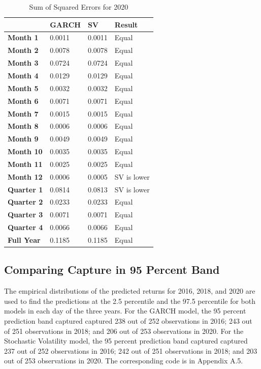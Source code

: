 \documentclass[12pt,letterpaper,reqno,fleqn]{article}
\begin{document}
\begin{table}[!ht]
    \centering
    \begin{tabular}{|l|l|l|l|}
    \hline
        ~ & \textbf{GARCH} & \textbf{SV} & \textbf{Result} \\ \hline
        \textbf{Month 1} & 0.0011 & 0.0011 & Equal \\ \hline
        \textbf{Month 2} & 0.0078 & 0.0078 & Equal \\ \hline
        \textbf{Month 3} & 0.0724 & 0.0724 & Equal \\ \hline
        \textbf{Month 4} & 0.0129 & 0.0129 & Equal \\ \hline
        \textbf{Month 5} & 0.0032 & 0.0032 & Equal \\ \hline
        \textbf{Month 6} & 0.0071 & 0.0071 & Equal \\ \hline
        \textbf{Month 7} & 0.0015 & 0.0015 & Equal \\ \hline
        \textbf{Month 8} & 0.0006 & 0.0006 & Equal \\ \hline
        \textbf{Month 9} & 0.0049 & 0.0049 & Equal \\ \hline
        \textbf{Month 10} & 0.0035 & 0.0035 & Equal \\ \hline
        \textbf{Month 11} & 0.0025 & 0.0025 & Equal \\ \hline
        \textbf{Month 12} & 0.0006 & 0.0005 & SV is lower \\ \hline
        \textbf{Quarter 1} & 0.0814 & 0.0813 & SV is lower \\ \hline
        \textbf{Quarter 2} & 0.0233 & 0.0233 & Equal \\ \hline
        \textbf{Quarter 3} & 0.0071 & 0.0071 & Equal \\ \hline
        \textbf{Quarter 4} & 0.0066 & 0.0066 & Equal \\ \hline
        \textbf{Full Year} & 0.1185 & 0.1185 & Equal \\ \hline
    \end{tabular}
\caption{Sum of Squared Errors for 2020}
\end{table}

\newpage
\subsection{Comparing Capture in 95 Percent Band}
The empirical distributions of the predicted returns for 2016, 2018, and 2020 are used to find the predictions at the 2.5 percentile and the 97.5 percentile for both models in each day of the three years. For the GARCH model, the 95 percent prediction band captured captured 238 out of 252 observations in 2016; 243 out of 251 observations in 2018; and 206 out of 253 observations in 2020. 
For the Stochastic Volatility model, the 95 percent prediction band captured captured 237 out of 252 observations in 2016; 242 out of 251 observations in 2018; and 203 out of 253 observations in 2020. The corresponding code is in Appendix A.5.
\end{document}
